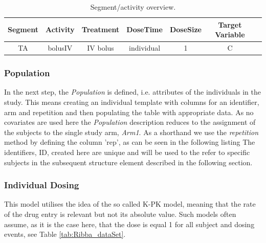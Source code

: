 \begin{table}[htdp!]
\begin{center}
\begin{tabular}{ccccccc}
\hline
Segment&Activity & Treatment & DoseTime & DoseSize & Target Variable \\
\hline
TA& bolusIV &  IV bolus & individual & 1 & C \\
\hline
\end{tabular}
\end{center}
\caption{Segment/activity overview.}
\label{tab:segementActivity_Ribba}
\end{table}

\subsubsection{Population}
In the next step, the \textit{Population} is defined, i.e. attributes of the individuals in the study. 
This means creating an individual template with columns for an identifier, arm and repetition and then
populating the table with appropriate data.
As no covariates are used here the \textit{Population} description reduces to the assignment 
of the subjects to the single study arm, \textit{Arm1}. As a shorthand we use the
\textit{repetition} method by defining the column 'rep', as can be seen in the following listing 
The identifiers, ID, created here are unique and will be used to the refer to specific subjects 
in the subsequent  structure element described in the following section.


\subsubsection{Individual Dosing}
\label{subsubsec:Ribba_indivDosing}

This model utilises the idea of the so called K-PK model, meaning that the rate of the drug entry is relevant
but not its absolute value. Such models often assume, as it is the case here, that the dose is equal 1
for all subject and dosing events, see Table \ref{tab:Ribba_dataSet}.

